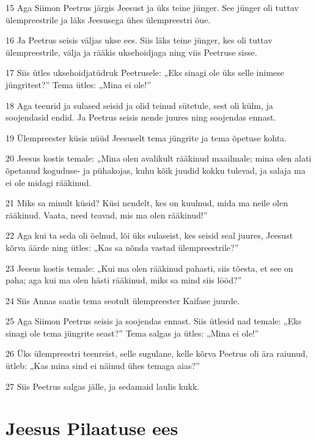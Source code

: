 \par 15 Aga Siimon Peetrus järgis Jeesust ja üks teine jünger. See jünger oli tuttav ülempreestrile ja läks Jeesusega ühes ülempreestri õue.
\par 16 Ja Peetrus seisis väljas ukse ees. Siis läks teine jünger, kes oli tuttav ülempreestrile, välja ja rääkis uksehoidjaga ning viis Peetruse sisse.
\par 17 Siis ütles uksehoidjatüdruk Peetrusele: „Eks sinagi ole üks selle inimese jüngritest?” Tema ütles: „Mina ei ole!”
\par 18 Aga teenrid ja sulased seisid ja olid teinud sütetule, sest oli külm, ja soojendasid endid. Ja Peetrus seisis nende juures ning soojendas ennast.
\par 19 Ülempreester küsis nüüd Jeesuselt tema jüngrite ja tema õpetuse kohta.
\par 20 Jeesus kostis temale: „Mina olen avalikult rääkinud maailmale; mina olen alati õpetanud koguduse- ja pühakojas, kuhu kõik juudid kokku tulevad, ja salaja ma ei ole midagi rääkinud.
\par 21 Miks sa minult küsid? Küsi nendelt, kes on kuulnud, mida ma neile olen rääkinud. Vaata, need teavad, mis ma olen rääkinud!”
\par 22 Aga kui ta seda oli öelnud, lõi üks sulaseist, kes seisid seal juures, Jeesust kõrva äärde ning ütles: „Kas sa nõnda vastad ülempreestrile?”
\par 23 Jeesus kostis temale: „Kui ma olen rääkinud pahasti, siis tõesta, et see on paha; aga kui ma olen hästi rääkinud, miks sa mind siis lööd?”
\par 24 Siis Annas saatis tema seotult ülempreester Kaifase juurde.
\par 25 Aga Siimon Peetrus seisis ja soojendas ennast. Siis ütlesid nad temale: „Eks sinagi ole tema jüngrite seast?” Tema salgas ja ütles: „Mina ei ole!”
\par 26 Üks ülempreestri teenreist, selle sugulane, kelle kõrva Peetrus oli ära raiunud, ütleb: „Kas mina sind ei näinud ühes temaga aias?”
\par 27 Siis Peetrus salgas jälle, ja sedamaid laulis kukk.

\section*{Jeesus Pilaatuse ees}

